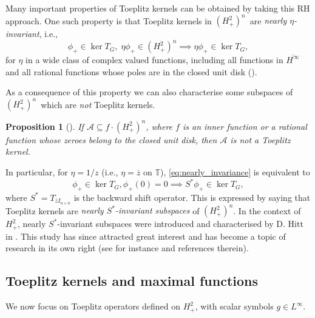 \documentclass[12pt]{elsarticle}
\numberwithin{equation}{section}
\theoremstyle{plain}
\newtheorem{prop}[thm]{Proposition}
\newcommand{\Hp}{\ensuremath{H^2_+}}
\newcommand{\Hpn}{\ensuremath{\left(\Hp\right)^n}}
\newcommand{\Linf}{\ensuremath{L^\infty}}
\newcommand{\Hinf}{\ensuremath{H^\infty}}
\newcommand{\TT}{\ensuremath{\mathbb{T}}}
\renewcommand{\AA}{\ensuremath{\mathcal{A}}}
\newcommand{\ol}[1]{\ensuremath{\overline{#1}}}
\renewcommand{\subset}{\subseteq}
\begin{document}
Many important properties of Toeplitz kernels can be obtained by taking this RH approach.
One such property is that Toeplitz kernels in \Hpn\ are {\em nearly $\eta$-invariant}, i.e.,
\begin{equation}
\label{eq:nearly_invariance}
\phi_+ \in \ker T_G, \; \eta\phi_+\in\Hpn \implies \eta\phi_+ \in \ker T_G,
\end{equation}
for $\eta$ in a wide class of complex valued functions, including all functions in $\ol\Hinf$ and all rational functions whose poles are in the closed unit disk (\cite{CP14}).

As a consequence of this property we can also characterise some subspaces of \Hpn\ which are {\em not} Toeplitz kernels.


\begin{prop}[{\cite[Thms. 3.5, 3.6]{CP14}}]
\label{prop:subspaces not TK}
If $\AA \subset f \cdot \Hpn$, where $f$ is an inner function or a rational function whose zeroes belong to the closed unit disk, then $\AA$ is \emph{not} a Toeplitz kernel.
\end{prop}


In particular, for $\eta = 1/z$ (i.e., $\eta = \ol z$ on \TT), \eqref{eq:nearly_invariance} is equivalent to
\begin{equation*}
\phi_+ \in \ker T_G, \phi_+(0) = 0 \implies S^*\phi_+ \in \ker T_G,
\end{equation*}
where $S^* = T_{\ol z I_{n\times n}}$ is the backward shift operator.
This is expressed by saying that Toeplitz kernels are {\em nearly $S^*$-invariant subspaces} of \Hpn.
In the context of \Hp, nearly $S^*$-invariant subspaces were introduced and characterised by D. Hitt in \cite{Hitt88}.
This study has since attracted great interest and has become a topic of research in its own right (see for instance \cite{ChaPar11} and references therein).




\subsection{Toeplitz kernels and maximal functions}
\label{subsec:TK maximal functions}

We now focus on Toeplitz operators defined on \Hp, with scalar symbols $g \in \Linf$.
\end{document}
